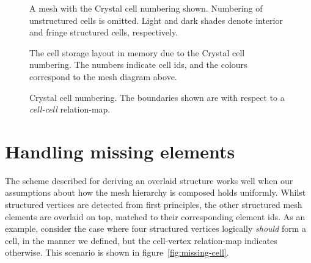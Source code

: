 \begin{figure}[H]
\sidebysidevertical
{
	
	\caption{A mesh with the Crystal cell numbering shown. Numbering of unstructured cells is omitted. Light and dark shades denote interior and fringe structured cells, respectively.}
}
{
	\small
	\tabcolsep=0.32mm
	
	\caption{The cell storage layout in memory due to the Crystal cell numbering. The numbers indicate cell ids, and the colours correspond to the mesh diagram above.}
}
\caption{Crystal cell numbering. The boundaries shown are with respect to a \emph{cell-cell} relation-map.}
\label{fig:renumbering}
\end{figure}


\section{Handling missing elements}
\label{sec:missing-elements}
The scheme described for deriving an overlaid structure works well when our assumptions about how the mesh hierarchy is composed holds uniformly. Whilst structured vertices are detected from first principles, the other structured mesh elements are overlaid on top, matched to their corresponding element ids. As an example, consider the case where four structured vertices logically \emph{should} form a cell, in the manner we defined, but the cell-vertex relation-map indicates otherwise. This scenario is shown in figure~\ref{fig:missing-cell}.

